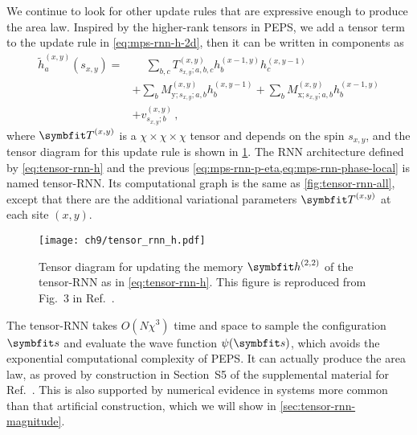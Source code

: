 We continue to look for other update rules that are expressive enough to produce the area law. Inspired by the higher-rank tensors in PEPS, we add a tensor term to the update rule in \cref{eq:mps-rnn-h-2d}, then it can be written in components as
\begin{align}
\tilde{h}^{(x, y)}_a(s_{x, y}) = &\phantom{{}+{}} \sum_{b, c} T^{(x, y)}_{s_{x, y}; a, b, c} h^{(x - 1, y)}_b h^{(x, y - 1)}_c \nonumber \\
&+ \sum_b M^{(x, y)}_{\text{y}; s_{x, y}; a, b} h^{(x, y - 1)}_b
+ \sum_b M^{(x, y)}_{\text{x}; s_{x, y}; a, b} h^{(x - 1, y)}_b \nonumber \\
&+ v^{(x, y)}_{s_{x, y}; b}\,,
\label{eq:tensor-rnn-h}
\end{align}
where $\mT^{(x, y)}$ is a $\chi \times \chi \times \chi$ tensor and depends on the spin $s_{x, y}$, and the tensor diagram for this update rule is shown in \cref{fig:tensor-rnn-h}. The RNN architecture defined by \cref{eq:tensor-rnn-h} and the previous \cref{eq:mps-rnn-p-eta,eq:mps-rnn-phase-local} is named tensor-RNN. Its computational graph is the same as \cref{fig:tensor-rnn-all}, except that there are the additional variational parameters $\mT^{(x, y)}$ at each site $(x, y)$.

\begin{figure}[htb]
\centering
\texttt{[image: ch9/tensor\_rnn\_h.pdf]}
\caption[Tensor diagram for memory update of tensor-RNN]{
Tensor diagram for updating the memory $\vh^{(2, 2)}$ of the tensor-RNN as in \cref{eq:tensor-rnn-h}.
This figure is reproduced from Fig.~3 in Ref.~\cite{wu2023tensor}.
}
\label{fig:tensor-rnn-h}
\end{figure}

The tensor-RNN takes $O(N \chi^3)$ time and space to sample the configuration $\vs$ and evaluate the wave function $\psi(\vs)$, which avoids the exponential computational complexity of PEPS. It can actually produce the area law, as proved by construction in Section~S5 of the supplemental material for Ref.~\cite{wu2023tensor}. This is also supported by numerical evidence in systems more common than that artificial construction, which we will show in \cref{sec:tensor-rnn-magnitude}.


